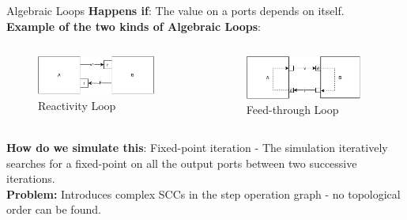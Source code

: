 \documentclass{beamer}
\begin{document}
\begin{frame}{Algebraic Loops}
    \textbf{Happens if}: The value on a ports depends on itself.\\
    \textbf{Example of the two kinds of Algebraic Loops}: 
    \begin{columns}[T] %
        \begin{column}{.48\textwidth}
            \begin{figure}    
                \includegraphics[width=0.9\textwidth]{images/reactive_loop_scenario.pdf}
                \caption{Reactivity Loop}
            \end{figure}
    \end{column}%
    \hfill%
    \begin{column}{.48\textwidth}
        \begin{figure}    
            \includegraphics[width=0.9\textwidth]{images/feedthroughloop.pdf}
            \caption{Feed-through Loop}
        \end{figure}
    \end{column}%
    \end{columns}
    \textbf{How do we simulate this}: Fixed-point iteration - The simulation iteratively searches for a fixed-point on all the output ports between two successive iterations.\\
    \textbf{Problem:} Introduces complex SCCs in the step operation graph - no topological order can be found.
\end{frame}
\end{document}
